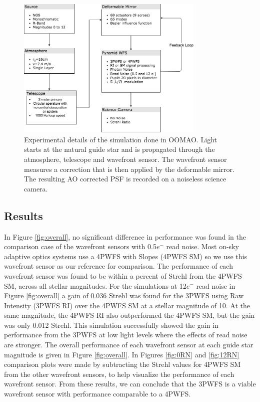\begin{figure}
    \centering
    \includegraphics[width=0.8\textwidth]{Chapter Materials/Chapter Four Materials/simulation.png}
    \caption{Experimental details of the simulation done in OOMAO. Light starts at the natural guide star and is propagated through the atmosphere, telescope and wavefront sensor. The wavefront sensor measures a correction that is then applied by the deformable mirror.  The resulting AO corrected PSF is recorded on a noiseless science camera. }
    \label{fig:simulationl}
\end{figure}

\subsection{Results}

In Figure \ref{fig:overall}, no significant difference in performance was found in the comparison case of the wavefront sensors with 0.5$e^-$ read noise. Most on-sky adaptive optics systems use a 4PWFS with Slopes (4PWFS SM) so we use this wavefront sensor as our reference for comparison. The performance of each wavefront sensor was found to be within a percent of Strehl from the 4PWFS SM, across all stellar magnitudes. For the simulations at 12$e^-$ read noise in Figure \ref{fig:overall} a gain of 0.036 Strehl was found for the 3PWFS using Raw Intensity (3PWFS RI) over the 4PWFS SM at a stellar magnitude of 10. At the same magnitude, the 4PWFS RI also outperformed the 4PWFS SM, but the gain was only 0.012 Strehl. This simulation successfully showed the gain in performance from the 3PWFS at low light levels where the effects of read noise are stronger. The overall performance of each wavefront sensor at each guide star magnitude is given in Figure \ref{fig:overall}. In Figures \ref{fig:0RN} and \ref{fig:12RN} comparison plots were made by subtracting the Strehl values for 4PWFS SM from the other wavefront sensors, to help visualize the performance of each wavefront sensor. From these results, we can conclude that the 3PWFS is a viable wavefront sensor with performance comparable to a 4PWFS.


